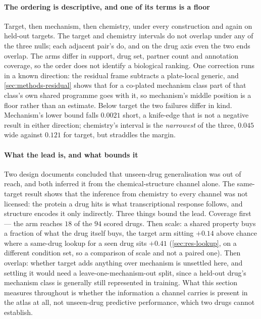 \paragraph{The ordering is descriptive, and one of its terms is a floor} Target,
then mechanism, then chemistry, under every construction and again on held-out
targets. The target and chemistry intervals do not overlap under any of the three
nulls; each adjacent pair's do, and on the drug axis even the two ends overlap.
The arms differ in support, drug set, partner count and annotation coverage, so
the order does not identify a biological ranking. One correction runs in a known
direction: the residual frame subtracts a plate-local generic, and
\cref{sec:methods-residual} shows that for a co-plated mechanism class part of
that class's own shared programme goes with it, so mechanism's middle position is
a floor rather than an estimate. Below target the two failures differ in kind.
Mechanism's lower bound falls $0.0021$ short, a knife-edge that is not a negative
result in either direction; chemistry's interval is the \emph{narrowest} of the
three, $0.045$ wide against $0.121$ for target, but straddles the margin.

\paragraph{What the lead is, and what bounds it} Two design documents concluded
that unseen-drug generalisation was out of reach, and both inferred it from the
chemical-structure channel alone. The same-target result shows that the inference
from chemistry to every channel was not licensed: the protein a drug hits is what
transcriptional response follows, and structure encodes it only indirectly. Three
things bound the lead. Coverage first --- the arm reaches $18$ of the $94$ scored
drugs. Then scale: a shared property buys a fraction of what the drug itself buys,
the target arm sitting $+0.14$ above chance where a same-drug lookup for a seen
drug sits $+0.41$ (\cref{sec:res-lookup}, on a different condition set, so a
comparison of scale and not a paired one). Then overlap: whether target adds
anything over mechanism is unsettled here, and settling it would need a
leave-one-mechanism-out split, since a held-out drug's mechanism class is
generally still represented in training. What this section measures throughout is
whether the information a channel carries is present in the atlas at all, not
unseen-drug predictive performance, which two drugs cannot establish.


